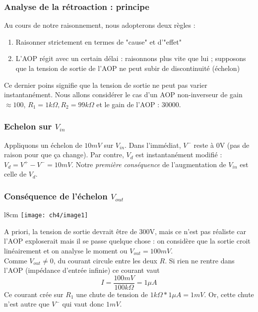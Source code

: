 		\subsubsection{Analyse de la rétroaction : principe}
		Au cours de notre raisonnement, nous adopterons deux règles :
		\begin{enumerate}
			\item Raisonner strictement en termes de "cause" et d'"effet"
			\item L'AOP régit avec un certain délai : raisonnons plus vite que 
			lui ; supposons que la tension de sortie de l'AOP ne peut subir de 
			discontinuité (échelon)
		\end{enumerate}
		Ce dernier poins signifie que la tension de sortie ne peut pas varier 
		instantanément.	Nous allons considérer le cas d'un AOP non-inverseur de 
		gain $\approx 100$, $R_1 = 1k\Omega, R_2 = 99k\Omega$ et le gain de 
		l'AOP : $30000$.
		
		
		\subsubsection{Echelon sur $V_{in}$}
		Appliquons un échelon de $10mV$ sur $V_{in}$. Dans l'immédiat, $V^-$ 
		reste à 0V (pas de raison pour que ça change). Par contre, $V_d$ est 
		instantanément modifié : $V_d = V^+-V^- = 10mV$. Notre \textit{première 
		conséquence} de l'augmentation de $V_{in}$ est celle de $V_d$.
		
		\subsubsection{Conséquence de l'échelon $V_{out}$}
		\begin{wrapfigure}[8]{l}{8cm}
		\vspace{-8mm}
		\texttt{[image: ch4/image1]}
		\end{wrapfigure}
		A priori, la tension de sortie devrait être de 300V, mais ce n'est pas
		réaliste car l'AOP exploserait mais il se passe quelque chose : on 
		considère que la sortie croit linéairement et on analyse le moment ou 
		$V_{out} = 100mV$.\\
		Comme $V_{out}\neq 0$, du courant circule entre les deux $R$. Si rien 
		ne rentre dans l'AOP (impédance d'entrée infinie) ce courant vaut 
		\begin{equation}
		I = \dfrac{100mV}{100k\Omega} = 1\mu A
		\end{equation}
		Ce courant crée sur $R_1$ une chute de tension de $1k\Omega*1\mu A = 
		1mV$. Or, cette chute n'est autre que $V^-$ qui vaut donc $1mV$.
		
